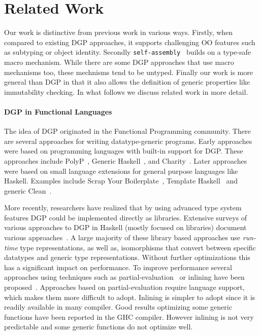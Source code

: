 \documentclass[preprint]{sigplanconf}
\newcommand{\selfassembly}{\texttt{self-assembly~}}
\begin{document}

\section{Related Work}
\label{sec:related-work}

Our work is distinctive from previous work in various ways.  Firstly,
when compared to existing DGP approaches, it supports challenging OO
features such as subtyping or object identity.  Secondly \selfassembly
builds on a type-safe macro mechanism. While there are some DGP approaches
that use macro mechanisms too, these mechnisms tend to be untyped.
Finally our work is more general than DGP in that it also allows the
definition of generic properties like immutability checking.
In what follows we discuss related work in more detail.

\paragraph{DGP in Functional Languages} 
The idea of DGP originated in the Functional Programming community.
There are several approaches for writing datatype-generic
programs. Early approaches were based on programming languages with
built-in support for DGP. These approaches include PolyP~\cite{},
Generic Haskell~\cite{}, and Charity~\cite{}. Later approaches were
based on small language extensions for general purpose languages like
Haskell. Examples include Scrap Your Boilerplate~\cite{}, Template
Haskell~\cite{} and generic Clean~\cite{}.

More recently, researchers have realized that by using advanced type
system features DGP could be implemented directly as
libraries. Extensive surveys of various approaches to DGP in Haskell
(mostly focused on libraries) document various approaches~\cite{}. A
large majority of these library based approaches use \emph{run-time}
type representations, as well as, isomorphisms that convert between
specific datatypes and generic type representations. Without further
optimizations this has a significant impact on performance. To improve
performance several approaches using techniques such as
partial-evaluation~\cite{} or inlining have been proposed~\cite{}.
Approaches based on partial-evaluation require language support, which
makes them more difficult to adopt. Inlining is simpler to adopt since
it is readily available in many compiler.  Good results optimizing
some generic functions have been reported in the GHC compiler. However
inlining is not very predictable and some generic functions do not
optimize well.
\end{document}
